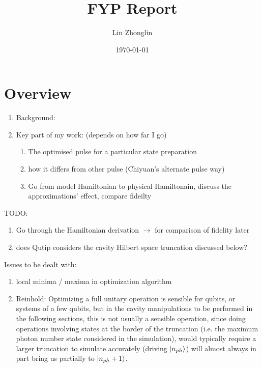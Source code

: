\documentclass{article}
\title{FYP Report}
\author{Lin Zhonglin}
\date{\today}
\begin{document}
\noindent

\maketitle
\tableofcontents

\section{Overview}
\begin{enumerate}
    \item Background: 
    \item Key part of my work: (depends on how far I go)
        \begin{enumerate}
            \item The optimised pulse for a particular state preparation
            \item how it differs from other pulse (Chiyuan's alternate pulse way)
            \item Go from model Hamiltonian to physical Hamiltonain, 
                    discuss the approximations' effect, 
                    compare fideilty
        \end{enumerate}
\end{enumerate}

TODO: 
\begin{enumerate}
    \item Go through the Hamiltonian derivation 
            $\rightarrow$ for comparison of fidelity later 
    \item does Qutip considers the cavity Hilbert space truncation discussed below? 
\end{enumerate}


Issues to be dealt with: 
\begin{enumerate}
    \item local minima / maxima in optimization algorithm
    \item Reinhold: 
        Optimizing a full unitary operation is sensible for qubits, or systems of a few qubits, but in the cavity manipulations to be performed in the following sections, this is not usually a sensible operation, since doing operations involving states at the border of the truncation (i.e. the maximum photon number state considered in the simulation), would typically require a larger truncation to simulate accurately (driving $\ket{n_{ph}}$) will almost always in part bring us partially to $\ket{n_{ph} + 1}$.
\end{enumerate}
\end{document}
